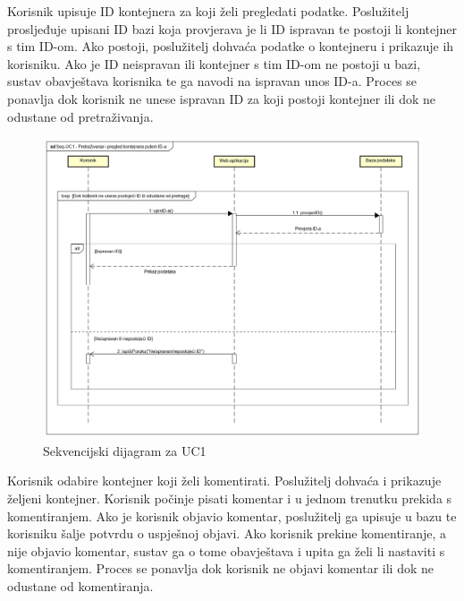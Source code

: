 			
			\noindent Korisnik upisuje ID kontejnera za koji želi pregledati podatke. Poslužitelj prosljeđuje upisani ID bazi koja provjerava je li ID ispravan te postoji li kontejner s tim ID-om. Ako postoji, poslužitelj dohvaća podatke o kontejneru i prikazuje ih korisniku. Ako je ID neispravan ili kontejner s tim ID-om ne postoji u bazi, sustav obavještava korisnika te ga navodi na ispravan unos ID-a. Proces se ponavlja dok korisnik ne unese ispravan ID za koji postoji kontejner ili dok ne odustane od pretraživanja.
			
			
			\eject
			
			\begin{figure}
				\centering
				\includegraphics[width=1.0\linewidth]{"slike/Seq-UC1.png"}
				\caption{Sekvencijski dijagram za UC1}
				\label{fig:UC1-Seq}
			\end{figure}
			
			\clearpage
			\eject
			
			
			\noindent Korisnik odabire kontejner koji želi komentirati. Poslužitelj dohvaća i prikazuje željeni kontejner. Korisnik počinje pisati komentar i u jednom trenutku prekida s komentiranjem. Ako je korisnik objavio komentar, poslužitelj ga upisuje u bazu te korisniku šalje potvrdu o uspješnoj objavi. Ako korisnik prekine komentiranje, a nije objavio komentar, sustav ga o tome obavještava i upita ga želi li nastaviti s komentiranjem. Proces se ponavlja dok korisnik ne objavi komentar ili dok ne odustane od komentiranja.
			
